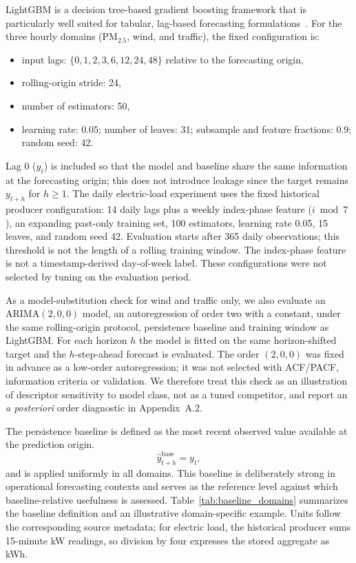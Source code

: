 \documentclass[pdflatex]{sn-jnl}
\begin{document}
LightGBM is a decision tree-based gradient boosting framework that is
particularly well suited for tabular, lag-based forecasting
formulations~\citep{ke2017lightgbm}. For the three hourly domains
(PM$_{2.5}$, wind, and traffic), the fixed configuration is:
\begin{itemize}
  \item input lags: $\{0,1,2,3,6,12,24,48\}$ relative to the forecasting origin,
  \item rolling-origin stride: 24,
  \item number of estimators: 50,
  \item learning rate: 0.05; number of leaves: 31; subsample and feature
  fractions: 0.9; random seed: 42.
\end{itemize}
Lag 0 ($y_t$) is included so that the model and baseline share the same
information at the forecasting origin; this does not introduce leakage
since the target remains $y_{t+h}$ for $h \geq 1$.
The daily electric-load experiment uses the fixed historical producer
configuration: 14 daily lags plus a weekly index-phase feature ($i\bmod7$),
an expanding past-only training set, 100 estimators, learning rate 0.05,
15 leaves, and random seed 42. Evaluation starts after 365 daily
observations; this threshold is not the length of a rolling training window.
The index-phase feature is not a timestamp-derived day-of-week label.
These configurations were not selected by tuning on the evaluation period.

As a model-substitution check for wind and traffic only, we also evaluate an
ARIMA$(2,0,0)$ model, an autoregression of order two with a constant, under
the same rolling-origin protocol, persistence baseline and training window as
LightGBM. For each horizon $h$ the model is fitted on the same horizon-shifted
target and the $h$-step-ahead forecast is evaluated. The order $(2,0,0)$ was
fixed in advance as a low-order autoregression; it was not selected with
ACF/PACF, information criteria or validation. We therefore treat this check as
an illustration of descriptor sensitivity to model class, not as a tuned
competitor, and report an \emph{a posteriori} order diagnostic in
Appendix~A.2.

The persistence baseline is defined as the most recent observed value
available at the prediction origin.
\begin{equation}
\hat{y}^{\mathrm{base}}_{t+h} = y_t,
\end{equation}
and is applied uniformly in all domains. This baseline is deliberately
strong in operational forecasting contexts and serves as the reference
level against which baseline-relative usefulness is assessed.
Table~\ref{tab:baseline_domains} summarizes the baseline definition and an
illustrative domain-specific example. Units follow the corresponding source
metadata; for electric load, the historical producer sums 15-minute kW
readings, so division by four expresses the stored aggregate as kWh.
\end{document}
